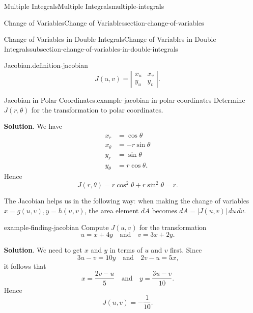 \documentclass[oneside,10pt,]{book}
\numberwithin{equation}{section}
\newcommand{\qq}[1]{\quad\text{#1}\quad}
\newcommand{\amp}{&}
\begin{document}
\begin{chapterptx}{Multiple Integrals}{}{Multiple Integrals}{}{}{multiple-integrals}
\begin{sectionptx}{Change of Variables}{}{Change of Variables}{}{}{section-change-of-variables}
\begin{subsectionptx}{Change of Variables in Double Integrals}{}{Change of Variables in Double Integrals}{}{}{subsection-change-of-variables-in-double-integrals}
\begin{definition}{Jacobian.}{definition-jacobian}
\begin{equation*}
J(u,v) = \left|\begin{array}{cc} x_{u} \amp x_{v} \\ y_{u} \amp y_{v}\end{array}\right|\text{.}
\end{equation*}
%
\end{definition}
\begin{example}{Jacobian in Polar Coordinates.}{example-jacobian-in-polar-coordinates}%
\hypertarget{p-1547}{}%
Determine \(J(r,\theta)\) for the transformation to polar coordinates.%
\par\smallskip%
\noindent\textbf{Solution}.\hypertarget{solution-257}{}\quad%
\hypertarget{p-1548}{}%
We have%
\begin{align*}
x_{r} \amp = \cos\theta \\
x_{\theta} \amp = -r\sin\theta \\
y_{r} \amp = \sin\theta \\
y_{\theta} \amp = r\cos\theta \text{.}
\end{align*}
Hence%
\begin{equation*}
J(r,\theta) = r\cos^{2}\theta + r\sin^{2}\theta = r\text{.}
\end{equation*}
%
\end{example}
\hypertarget{p-1549}{}%
The Jacobian helps us in the following way: when making the change of variables \(x = g(u,v), y= h(u,v)\), the area element \(dA\) becomes \(dA = |J(u,v)|\,du\,dv\).%
\begin{example}{}{example-finding-jacobian}%
\hypertarget{p-1550}{}%
Compute \(J(u,v)\) for the transformation%
\begin{equation*}
u = x + 4y \qq{and} v = 3x + 2y\text{.}
\end{equation*}
%
\par\smallskip%
\noindent\textbf{Solution}.\hypertarget{solution-258}{}\quad%
\hypertarget{p-1551}{}%
We need to get \(x\) and \(y\) in terms of \(u\) and \(v\) first. Since%
\begin{equation*}
3u - v = 10y \qq{and} 2v - u = 5x\text{,}
\end{equation*}
it follows that%
\begin{equation*}
x = \frac{2v - u}{5} \qq{and} y = \frac{3u - v}{10}\text{.}
\end{equation*}
Hence%
\begin{equation*}
J(u,v) = -\frac{1}{10}\text{.}
\end{equation*}
%
\end{example}

\end{subsectionptx}
\end{sectionptx}
\end{chapterptx}
\end{document}
